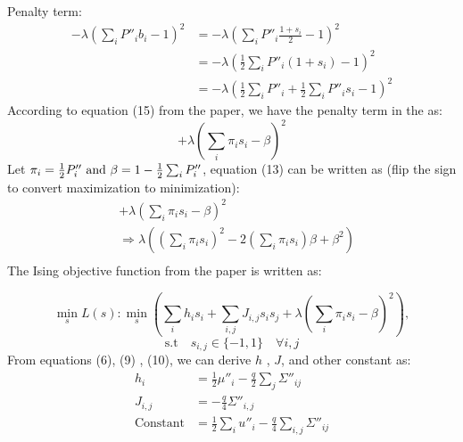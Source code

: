 \documentclass{article}
\begin{document}
Penalty term:
\begin{align}
	-\lambda \left(\sum_{i}^{} P''_i b_i - 1\right)^2 & = -\lambda \left(\sum_{i}^{} P''_i \frac{1+s_i}{2} - 1\right)^2                               \\
	                                                  & = -\lambda \left(\frac{1}{2} \sum_{i}^{}P''_i(1+s_i) -1\right)^2                              \\
	                                                  & = -\lambda \left(\frac{1}{2} \sum_{i}^{}P''_i + \frac{1}{2} \sum_{i}^{}P''_i s_i - 1\right)^2
\end{align}
According to equation (15) from the paper, we have the penalty term in the as:
\begin{equation}
	+\lambda \left(\sum_{i}^{}\pi_i s_i - \beta\right)^2
\end{equation}
Let $\pi_i = \frac{1}{2} P''_i\) and \(\beta = 1-\frac{1}{2} \sum_{i}^{} P''_i $, equation (13) can be written as (flip the sign to convert maximization to minimization):
\begin{align}
	 & +\lambda \left(\sum_{i}^{}\pi_i s_i - \beta\right)^2                                                                       \\
	 & \Rightarrow \lambda \left(\left(\sum_{i}^{}\pi_i s_i\right)^2 - 2 \left(\sum_{i}^{}\pi_i s_i\right)\beta + \beta^2 \right) \\
\end{align}
\noindent The Ising objective function from the paper is written as:

\begin{equation}
	\min_{s} L(s) : \min_s \left(\sum_{i}^{}h_i s_i + \sum_{i,j}^{}J_{i,j} s_i s_j + \lambda \left(\sum_{i}^{}\pi_i s_i - \beta\right)^2\right),
\end{equation}
\begin{equation*}
	\text{s.t} \quad s_{i,j} \in \{-1, 1\} \quad \forall i,j
\end{equation*}
From equations (6), (9) , (10), we can derive $h$ , $J$, and other constant as:
\begin{align}
	h_i             & = \frac{1}{2} \mu''_i -\frac{q}{2} \sum_{j}^{}\Sigma''_{ij}               \\
	J_{i,j}         & = -\frac{q}{4} \Sigma''_{i,j}                                             \\
	\text{Constant} & = \frac{1}{2} \sum_{i}^{} u''_i - \frac{q}{4} \sum_{i,j}^{} \Sigma''_{ij}
\end{align}
\end{document}
